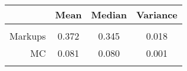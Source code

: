 \begin{tabular}{r|ccc}
 & Mean & Median & Variance \\\hline &&& \\ 
 Markups   & 0.372 & 0.345 & 0.018 \\ 
 MC        & 0.081 & 0.080 & 0.001 \\ 
 &&& \\\hline 
\end{tabular}
